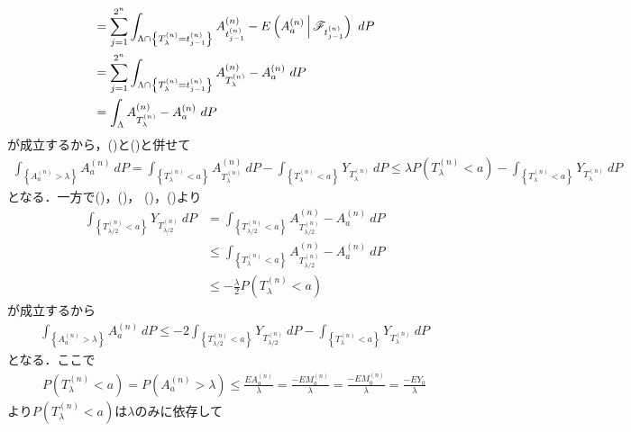 \begin{prf}
\begin{description}
\begin{align}
					&= \sum_{j=1}^{2^n} \int_{\Lambda \cap \left\{T^{(n)}_\lambda=t^{(n)}_{j-1}\right\}} 
						A^{(n)}_{t^{(n)}_{j-1}} - E\left( A^{(n)}_a \, \middle|\, \mathscr{F}_{t^{(n)}_{j-1}} \right)\ dP \\
					&= \sum_{j=1}^{2^n} \int_{\Lambda \cap \left\{T^{(n)}_\lambda=t^{(n)}_{j-1}\right\}} 
						A^{(n)}_{T^{(n)}_\lambda} - A^{(n)}_a\ dP \\
					&= \int_\Lambda A^{(n)}_{T^{(n)}_\lambda} - A^{(n)}_a\ dP
					\label{eq:chapter_1_theorem_4_10_5}
				\end{align}
				が成立するから，()と()と併せて
				\begin{align}
					\int_{\left\{A^{(n)}_a > \lambda\right\}} A^{(n)}_a\ dP
					= \int_{\left\{T^{(n)}_\lambda < a\right\}} A^{(n)}_{T^{(n)}_\lambda}\ dP
						- \int_{\left\{T^{(n)}_\lambda < a\right\}} Y_{T^{(n)}_\lambda}\ dP
					\leq \lambda P\left(T^{(n)}_\lambda < a\right) 
						- \int_{\left\{T^{(n)}_\lambda < a\right\}} Y_{T^{(n)}_\lambda}\ dP
				\end{align}
				となる．一方で()，()，
				()，()より
				\begin{align}
					\int_{\left\{T^{(n)}_{\lambda/2} < a\right\}} Y_{T^{(n)}_{\lambda/2}}\ dP
					&= \int_{\left\{T^{(n)}_{\lambda/2} < a\right\}} A^{(n)}_{T^{(n)}_{\lambda/2}} - A^{(n)}_a\ dP \\
					&\leq \int_{\left\{T^{(n)}_{\lambda} < a\right\}} A^{(n)}_{T^{(n)}_{\lambda/2}} - A^{(n)}_a\ dP \\
					&\leq -\frac{\lambda}{2} P\left(T^{(n)}_{\lambda} < a\right)
				\end{align}
				が成立するから
				\begin{align}
					\int_{\left\{A^{(n)}_a > \lambda\right\}} A^{(n)}_a\ dP
					\leq -2 \int_{\left\{T^{(n)}_{\lambda/2} < a\right\}} Y_{T^{(n)}_{\lambda/2}}\ dP
						- \int_{\left\{T^{(n)}_\lambda < a\right\}} Y_{T^{(n)}_\lambda}\ dP
				\end{align}
				となる．ここで
				\begin{align}
					P\left(T^{(n)}_{\lambda} < a\right)
					= P\left(A^{(n)}_a > \lambda\right)
					\leq \frac{E A^{(n)}_a}{\lambda}
					= \frac{- E M^{(n)}_a}{\lambda}
					= \frac{- E M^{(n)}_0}{\lambda}
					= \frac{- E Y_0}{\lambda}
				\end{align}
				より$P\left(T^{(n)}_{\lambda} < a\right)$は$\lambda$のみに依存して

\end{description}
\end{prf}
